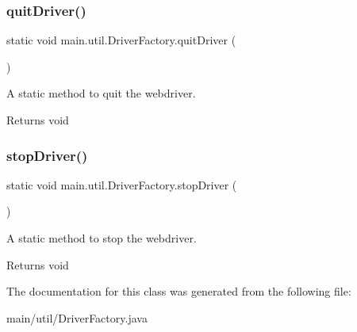 \subsubsection{\texorpdfstring{quit\+Driver()}{quitDriver()}}
{\footnotesize\ttfamily static void main.\+util.\+Driver\+Factory.\+quit\+Driver (\begin{DoxyParamCaption}{ }\end{DoxyParamCaption})\hspace{0.3cm}{\ttfamily [static]}}

A static method to quit the webdriver. \begin{DoxyReturn}{Returns}
void 
\end{DoxyReturn}
\mbox{\label{classmain_1_1util_1_1_driver_factory_abdd3d0a38b3fa5faa46119170c124518}} 
\subsubsection{\texorpdfstring{stop\+Driver()}{stopDriver()}}
{\footnotesize\ttfamily static void main.\+util.\+Driver\+Factory.\+stop\+Driver (\begin{DoxyParamCaption}{ }\end{DoxyParamCaption})\hspace{0.3cm}{\ttfamily [static]}}

A static method to stop the webdriver. \begin{DoxyReturn}{Returns}
void 
\end{DoxyReturn}


The documentation for this class was generated from the following file\+:\begin{DoxyCompactItemize}
\item 
main/util/Driver\+Factory.\+java\end{DoxyCompactItemize}
